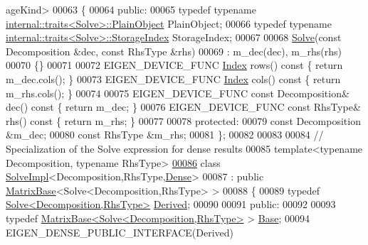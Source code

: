 \begin{DoxyCode}
      ageKind>
00063 \{
00064 \textcolor{keyword}{public}:
00065   \textcolor{keyword}{typedef} \textcolor{keyword}{typename} \hyperlink{struct_eigen_1_1internal_1_1traits}{internal::traits<Solve>::PlainObject} PlainObject;
00066   \textcolor{keyword}{typedef} \textcolor{keyword}{typename} \hyperlink{struct_eigen_1_1internal_1_1traits}{internal::traits<Solve>::StorageIndex} StorageIndex;
00067   
00068   \hyperlink{group___core___module_class_eigen_1_1_solve}{Solve}(\textcolor{keyword}{const} Decomposition &dec, \textcolor{keyword}{const} RhsType &rhs)
00069     : m\_dec(dec), m\_rhs(rhs)
00070   \{\}
00071   
00072   EIGEN\_DEVICE\_FUNC \hyperlink{namespace_eigen_a62e77e0933482dafde8fe197d9a2cfde}{Index} rows()\textcolor{keyword}{ const }\{ \textcolor{keywordflow}{return} m\_dec.cols(); \}
00073   EIGEN\_DEVICE\_FUNC \hyperlink{namespace_eigen_a62e77e0933482dafde8fe197d9a2cfde}{Index} cols()\textcolor{keyword}{ const }\{ \textcolor{keywordflow}{return} m\_rhs.cols(); \}
00074 
00075   EIGEN\_DEVICE\_FUNC \textcolor{keyword}{const} Decomposition& dec()\textcolor{keyword}{ const }\{ \textcolor{keywordflow}{return} m\_dec; \}
00076   EIGEN\_DEVICE\_FUNC \textcolor{keyword}{const} RhsType&       rhs()\textcolor{keyword}{ const }\{ \textcolor{keywordflow}{return} m\_rhs; \}
00077 
00078 \textcolor{keyword}{protected}:
00079   \textcolor{keyword}{const} Decomposition &m\_dec;
00080   \textcolor{keyword}{const} RhsType       &m\_rhs;
00081 \};
00082 
00083 
00084 \textcolor{comment}{// Specialization of the Solve expression for dense results}
00085 \textcolor{keyword}{template}<\textcolor{keyword}{typename} Decomposition, \textcolor{keyword}{typename} RhsType>
\hyperlink{class_eigen_1_1_solve_impl_3_01_decomposition_00_01_rhs_type_00_01_dense_01_4}{00086} \textcolor{keyword}{class }\hyperlink{class_eigen_1_1_solve_impl}{SolveImpl}<Decomposition,RhsType,\hyperlink{struct_eigen_1_1_dense}{Dense}>
00087   : \textcolor{keyword}{public} \hyperlink{group___core___module_class_eigen_1_1_matrix_base}{MatrixBase}<Solve<Decomposition,RhsType> >
00088 \{
00089   \textcolor{keyword}{typedef} \hyperlink{group___core___module_class_eigen_1_1_solve}{Solve<Decomposition,RhsType>} \hyperlink{group___core___module_class_eigen_1_1_solve}{Derived};
00090   
00091 \textcolor{keyword}{public}:
00092   
00093   \textcolor{keyword}{typedef} \hyperlink{group___core___module_class_eigen_1_1_matrix_base}{MatrixBase<Solve<Decomposition,RhsType>} > 
      \hyperlink{class_eigen_1_1_dense_coeffs_base}{Base};
00094   EIGEN\_DENSE\_PUBLIC\_INTERFACE(Derived)

\end{DoxyCode}
